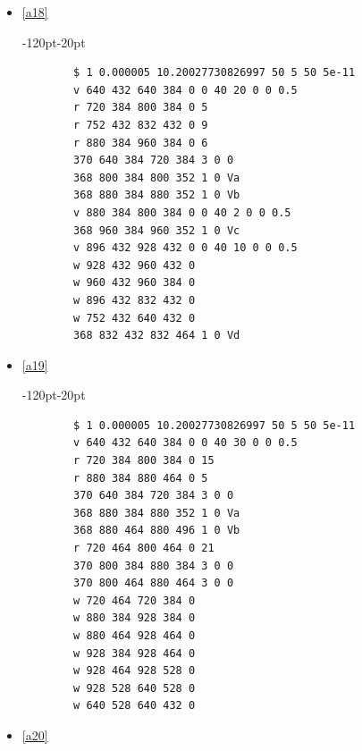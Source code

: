 \documentclass{article}
\begin{document}
\begin{itemize}
	\item \href{https://www.falstad.com/circuit/circuitjs.html?ctz=CQAgjCAMB0l3BWcMBMcUHYMGZIA4UA2ATmIxAUgoqoQFMBaMMAKADcRCAWKr7FTjxDY8XKOKFpxVGAhYAnEBikixeOMNHi5ijAgF8BefiEPjiCkHnWaxxQlVXjCLbBirdHW5V7HZproR4VhpO6o764OIAagCGgcHWvlY22JEQVNEARuwpyeG20qZUAjJQ0HLYQSD2ybXC6TEAxrl49qYmxCjBZmVCYGUyFSwA7jXdHQL1vaM1DpNzyZCzbYQLxgYmy2N6mwKeC8tViSZmG6bcUZkAJixAA}{\ref{a18}} \\
\begin{adjustwidth}{-120pt}{-20pt}
	\begin{lstlisting}
		$ 1 0.000005 10.20027730826997 50 5 50 5e-11
		v 640 432 640 384 0 0 40 20 0 0 0.5
		r 720 384 800 384 0 5
		r 752 432 832 432 0 9
		r 880 384 960 384 0 6
		370 640 384 720 384 3 0 0
		368 800 384 800 352 1 0 Va
		368 880 384 880 352 1 0 Vb
		v 880 384 800 384 0 0 40 2 0 0 0.5
		368 960 384 960 352 1 0 Vc
		v 896 432 928 432 0 0 40 10 0 0 0.5
		w 928 432 960 432 0
		w 960 432 960 384 0
		w 896 432 832 432 0
		w 752 432 640 432 0
		368 832 432 832 464 1 0 Vd
	\end{lstlisting}
\end{adjustwidth}
\clearpage
	\item \href{https://www.falstad.com/circuit/circuitjs.html?ctz=CQAgjCAMB0l3BWcMBMcUHYMGZIA4UA2ATmIxAUgoqoQFMBaMMAKADcRCAWKr7FTjxDY8XKOKG5xVGAhYAnEBjTDRIPHFViqYOYrwat6w127i52DFW5URY5bbXZpLbITzHHYg7YQCIVABqAIau7p4gpt4mxITg4oEARgpKKlHqmulUKKyWVBpeEXbCLnkZvGY+kWbOMiwA7qkV9irFkA1FasQoHm0dVendHlkdQ0ZjI40TZmN+Hu1TPRRLNsvzHatzgrz8UCxAA}{\ref{a19}}  \\
\begin{adjustwidth}{-120pt}{-20pt}
	\begin{lstlisting}
		$ 1 0.000005 10.20027730826997 50 5 50 5e-11
		v 640 432 640 384 0 0 40 30 0 0 0.5
		r 720 384 800 384 0 15
		r 880 384 880 464 0 5
		370 640 384 720 384 3 0 0
		368 880 384 880 352 1 0 Va
		368 880 464 880 496 1 0 Vb
		r 720 464 800 464 0 21
		370 800 384 880 384 3 0 0
		370 800 464 880 464 3 0 0
		w 720 464 720 384 0
		w 880 384 928 384 0
		w 880 464 928 464 0
		w 928 384 928 464 0
		w 928 464 928 528 0
		w 928 528 640 528 0
		w 640 528 640 432 0
	\end{lstlisting}
\end{adjustwidth}
	\item \href{https://www.falstad.com/circuit/circuitjs.html?ctz=CQAgjCAMB0l3BWcMBMcUHYMGZIA4UA2ATmIxAUgoqoQFMBaMMAKADcRCMUQAWQ3p258whKON5UwVGVGgIWAJxDcq2PIIyE8IdYKq8lK7bo3GdvXjqooW2DFS489KtKcHZxkOya06XfrrYYhBUAGoAhkaBLnii7uK29lR4AglxYi6eMnYO5nxW+bzEmV7sIKmC-IKVImKyktSyMAoA7kI8vPFOCd7ttV1itS59RSUdfOOjPcViM2mjgbMVacujA+MDCyxAA}{\ref{a20}}  \\

\end{itemize}
\end{document}

